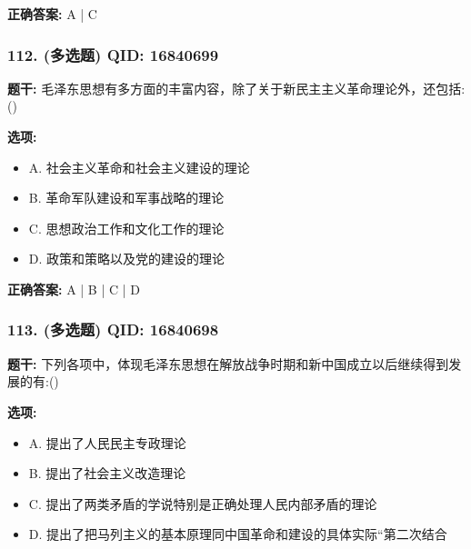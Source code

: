 \documentclass[12pt,UTF8]{ctexart}
\begin{document}
\textbf{正确答案:}
A | C

\vspace{0.3em}\hrulefill\vspace{0.7em}

\subsubsection*{112. (多选题) \small QID: 16840699}

\textbf{题干:}
毛泽东思想有多方面的丰富内容，除了关于新民主主义革命理论外，还包括:()

\textbf{选项:}
\begin{itemize}[leftmargin=*]

  \item A. 社会主义革命和社会主义建设的理论

  \item B. 革命军队建设和军事战略的理论

  \item C. 思想政治工作和文化工作的理论

  \item D. 政策和策略以及党的建设的理论

\end{itemize}

\textbf{正确答案:}
A | B | C | D

\vspace{0.3em}\hrulefill\vspace{0.7em}

\subsubsection*{113. (多选题) \small QID: 16840698}

\textbf{题干:}
下列各项中，体现毛泽东思想在解放战争时期和新中国成立以后继续得到发展的有:()

\textbf{选项:}
\begin{itemize}[leftmargin=*]

  \item A. 提出了人民民主专政理论

  \item B. 提出了社会主义改造理论

  \item C. 提出了两类矛盾的学说特别是正确处理人民内部矛盾的理论

  \item D. 提出了把马列主义的基本原理同中国革命和建设的具体实际“第二次结合

\end{itemize}
\end{document}
